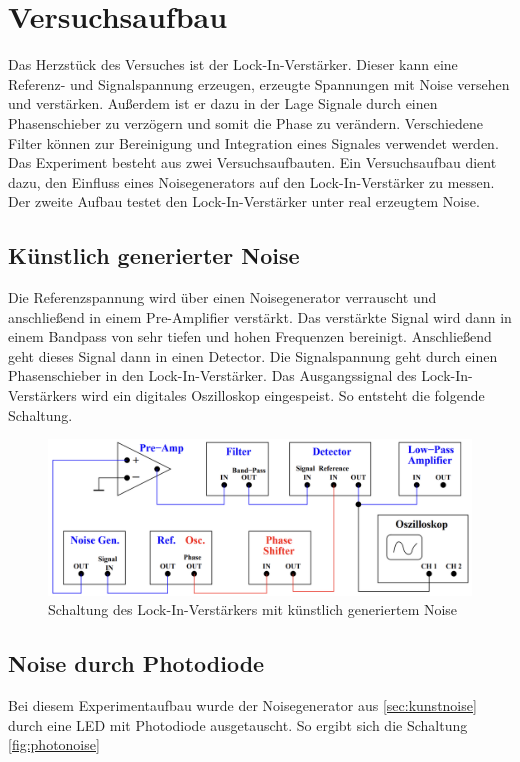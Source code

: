 


\section{Versuchsaufbau}
Das Herzstück des Versuches ist der Lock-In-Verstärker. Dieser kann eine Referenz- und Signalspannung erzeugen, erzeugte Spannungen mit 
Noise versehen und verstärken. Außerdem ist er dazu in der Lage Signale durch einen Phasenschieber zu verzögern und somit die Phase zu 
verändern. Verschiedene Filter können zur Bereinigung und Integration eines Signales verwendet werden.\\
\noindent
Das Experiment besteht aus zwei Versuchsaufbauten. 
Ein Versuchsaufbau dient dazu, den Einfluss eines Noisegenerators auf den Lock-In-Verstärker zu messen. Der zweite Aufbau testet 
den Lock-In-Verstärker unter real erzeugtem Noise.

\subsection{Künstlich generierter Noise}
\label{sec:kunstnoise}
Die Referenzspannung wird über einen Noisegenerator verrauscht und anschließend in einem Pre-Amplifier verstärkt. Das verstärkte Signal 
wird dann in einem Bandpass von sehr tiefen und hohen Frequenzen bereinigt. Anschließend geht dieses Signal dann in einen Detector.
Die Signalspannung geht durch einen Phasenschieber in den Lock-In-Verstärker. Das Ausgangssignal des Lock-In-Verstärkers wird ein digitales 
Oszilloskop eingespeist. So entsteht die folgende Schaltung.

\begin{figure}[H]
    \includegraphics[width=\textwidth]{Schaltung_kunstliche.png}
    \caption{Schaltung des Lock-In-Verstärkers mit künstlich generiertem Noise \cite{Versuchsanleitung_v303}}
    \label{fig:kunstnoise}
\end{figure}

\subsection{Noise durch Photodiode}
\noindent
Bei diesem Experimentaufbau wurde der Noisegenerator aus \autoref{sec:kunstnoise} durch eine LED mit Photodiode ausgetauscht. So ergibt sich 
die Schaltung \ref{fig:photonoise}

